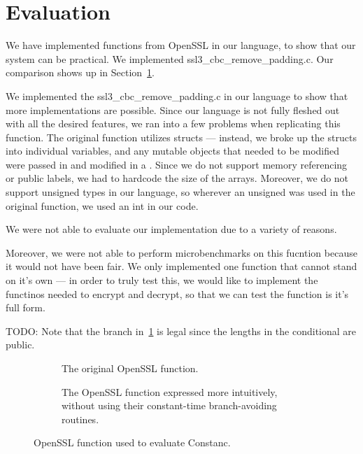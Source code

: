 \section{Evaluation}
\label{sec:evaluation}

We have implemented functions from OpenSSL in our language, to show that our
system can be practical. We implemented ssl3\_cbc\_remove\_padding.c. Our
comparison shows up in Section~\ref{sec:evaluation}.

 We implemented the ssl3\_cbc\_remove\_padding.c in our language to show that more implementations are possible. Since our language is not fully fleshed out with all the desired features, we ran into a few problems when replicating this function. The original function utilizes structs --- instead, we broke up the structs into individual variables, and any mutable objects that needed to be modified were passed in and modified in a \bytearray. Since we do not support memory referencing or public labels, we had to hardcode the size of the arrays. Moreover, we do not support unsigned types in our language, so wherever an unsigned was used in the original function, we used an int in our code.

We were not able to evaluate our implementation due to a variety of reasons.

\cite{almeida2016}

Moreover, we were not able to perform microbenchmarks on this fucntion because
it would not have been fair. We only implemented one function that cannot stand
on it's own --- in order to truly test this, we would like to implement the
functinos needed to encrypt and decrypt, so that we can test the function is
it's full form.

TODO: Note that the branch in~\ref{fig:openssl-original} is legal since the lengths in the conditional are public.

\begin{figure*}
    \centering
    \begin{subfigure}[b]{0.49\textwidth}
		\dbox{}
		\caption{The original OpenSSL function.\newline}
		\label{fig:openssl-original}
    \end{subfigure}
    \begin{subfigure}[b]{0.49\textwidth}
		\dbox{}
		\caption{The OpenSSL function expressed more intuitively, without using their constant-time branch-avoiding routines.}
		\label{fig:openssl-intuitive}
    \end{subfigure}
    \caption{OpenSSL function used to evaluate Constanc.}\label{fig:openssl}\floatspace
\end{figure*}
